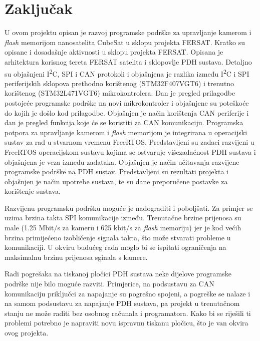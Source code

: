 \chapter{Zaključak}

U ovom projektu opisan je razvoj programske podrške za 
upravljanje kamerom i \textit{flash} memorijom nanosatelita 
CubeSat u sklopu projekta FERSAT. Kratko su opisane i dosadašnje
 aktivnosti u sklopu projekta FERSAT. Opisana je arhitektura korisnog
 tereta FERSAT satelita i sklopovlje PDH sustava. 
 Detaljno su objašnjeni I\textsuperscript{2}C, SPI i 
 CAN protokoli i objašnjena je razlika između 
 I\textsuperscript{2}C i SPI periferijskih sklopova prethodno 
 korištenog (STM32F407VGT6) i trenutno korištenog (STM32L471VGT6) 
 mikrokontrolera. Dan je pregled prilagodbe postojeće programske podrške na novi mikrokontroler i 
 objašnjene su poteškoće do kojih je došlo kod prilagodbe. Objašnjen je način korištenja CAN periferije i dan je pregled 
 funkcija koje će se koristiti za CAN komunikaciju. 
 Programska potpora za upravljanje kamerom i 
 \textit{flash} memorijom je integrirana u operacijski sustav 
 za rad u stvarnom vremenu FreeRTOS. 
 Predstavljeni su zadaci razvijeni u FreeRTOS operacijskom 
 sustavu kojima se ostvaruje višezadaćnost PDH sustava i 
 objašnjena je veza između zadataka. Objašnjen je način 
 učitavanja razvijene programske podrške na PDH sustav. 
 Predstavljeni su rezultati projekta i objašnjen je način 
 upotrebe sustava, te su dane preporučene postavke za 
 korištenje sustava.

Razvijenu programsku podršku moguće je nadograditi i poboljšati. 
Za primjer se uzima brzina takta SPI komunikacije između. %
 Trenutačne brzine prijenosa su male (1.25 Mbit/s za kameru i 625 kbit/s za \textit{flash} memoriju) 
 jer je kod većih brzina primijećeno izobličenje signala takta, što može stvarati probleme u komunikaciji. 
U okviru budućeg rada moglo bi se ispitati ograničenja na maksimalnu 
brzinu prijenosa sginala s kamere.

Radi pogrešaka na tiskanoj pločici PDH sustava neke dijelove programske podrške nije bilo moguće razviti. 
Primjerice, na podsustavu za CAN komunikaciju priključci
za napajanje su pogrešno spojeni, a pogreške se nalaze 
i na samom podsustavu za napajanje PDH sustava, 
pa projekt u trenutačnom stanju ne može raditi bez 
osobnog računala i programatora. 
Kako bi se riješili ti problemi potrebno je napraviti novu 
ispravnu tiskanu pločicu, što je van okvira ovog projekta.
